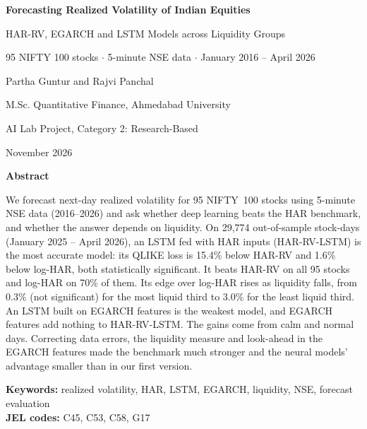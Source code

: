 \documentclass[11pt,a4paper]{article}
\begin{document}
\begin{titlepage}
\centering
\vspace*{2.2cm}
{\LARGE\bfseries Forecasting Realized Volatility of Indian Equities\par}
\vspace{6pt}
{\Large HAR-RV, EGARCH and LSTM Models across Liquidity Groups\par}
\vspace{14pt}
{\large 95 NIFTY 100 stocks $\cdot$ 5-minute NSE data $\cdot$ January 2016 -- April 2026\par}
\vspace{1.6cm}
{\large Partha Guntur \quad and \quad Rajvi Panchal\par}
\vspace{6pt}
M.Sc. Quantitative Finance, Ahmedabad University\par
AI Lab Project, Category 2: Research-Based\par
\vspace{10pt}
November 2026\par
\vspace{1.4cm}
\begin{minipage}{0.9\textwidth}\small\setlength{\parskip}{4pt}
{\centering\textbf{Abstract}\par}\vspace{6pt}
\noindent We forecast next-day realized volatility for 95 NIFTY~100 stocks using 5-minute NSE data
(2016--2026) and ask whether deep learning beats the HAR benchmark, and whether the answer depends
on liquidity. On 29,774 out-of-sample stock-days (January 2025 -- April 2026), an LSTM fed with HAR
inputs (HAR-RV-LSTM) is the most accurate model: its QLIKE loss is 15.4\% below HAR-RV and 1.6\% below
log-HAR, both statistically significant. It beats HAR-RV on all 95 stocks and log-HAR on 70\% of them.
Its edge over log-HAR rises as liquidity falls, from 0.3\% (not significant) for the most liquid third
to 3.0\% for the least liquid third. An LSTM built on EGARCH features is the weakest model, and EGARCH
features add nothing to HAR-RV-LSTM. The gains come from calm and normal days. Correcting data errors,
the liquidity measure and look-ahead in the EGARCH features made the benchmark much stronger and the
neural models' advantage smaller than in our first version.

\medskip
\noindent\textbf{Keywords:} realized volatility, HAR, LSTM, EGARCH, liquidity, NSE, forecast evaluation\\
\textbf{JEL codes:} C45, C53, C58, G17

\end{minipage}
\vfill
\end{titlepage}
\end{document}
